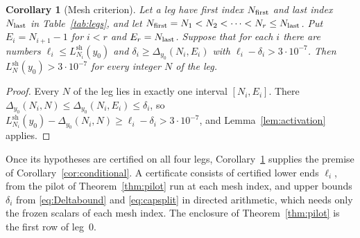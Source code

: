 \documentclass[11pt]{article}
\newtheorem{corollary}[theorem]{Corollary}
\theoremstyle{remark}
\numberwithin{equation}{section}
\begin{document}
\begin{corollary}[Mesh criterion]\label{cor:mesh}
Let a leg have first index $N_{\rm first}$ and last index $N_{\rm last}$
in Table~\ref{tab:legs}, and let
$N_{\rm first}=N_1<N_2<\cdots<N_r\le N_{\rm last}$. Put $E_i=N_{i+1}-1$
for $i<r$ and $E_r=N_{\rm last}$. Suppose that for each $i$ there are
numbers $\ell_i\le L^{\mathrm{sh}}_{N_i}(y_0)$ and
$\delta_i\ge\Delta_{y_0}(N_i,E_i)$ with $\ell_i-\delta_i>3\cdot10^{-7}$.
Then $L^{\mathrm{sh}}_N(y_0)>3\cdot10^{-7}$ for every integer $N$ of the
leg.
\end{corollary}
\begin{proof}
Every $N$ of the leg lies in exactly one interval $[N_i,E_i]$. There
$\Delta_{y_0}(N_i,N)\le\Delta_{y_0}(N_i,E_i)\le\delta_i$, so
$L^{\mathrm{sh}}_{N_i}(y_0)-\Delta_{y_0}(N_i,N)\ge\ell_i-\delta_i
>3\cdot10^{-7}$, and Lemma~\ref{lem:activation} applies.
\end{proof}

Once its hypotheses are certified on all four legs,
Corollary~\ref{cor:mesh} supplies the premise of
Corollary~\ref{cor:conditional}. A certificate consists of certified
lower ends $\ell_i$, from the pilot of Theorem~\ref{thm:pilot} run at each
mesh index, and upper bounds $\delta_i$ from \eqref{eq:Deltabound} and
\eqref{eq:capsplit} in directed arithmetic, which needs only the frozen
scalars of each mesh index. The enclosure of Theorem~\ref{thm:pilot} is
the first row of leg~0.
\end{document}
